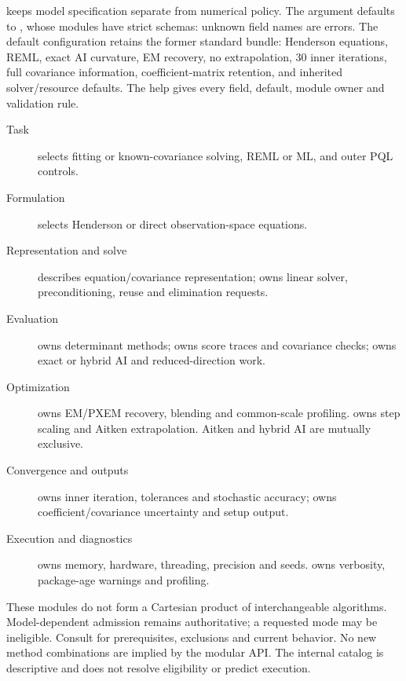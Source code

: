 \documentclass[a4paper]{book}
\begin{document}
%
\begin{Details}\relax


 keeps model specification separate from numerical policy.
The  argument defaults to , whose
modules have strict schemas: unknown field names are errors. The default
configuration retains the former standard bundle: Henderson equations, REML,
exact AI curvature, EM recovery, no extrapolation, 30 inner iterations,
full covariance information, coefficient-matrix retention, and inherited
solver/resource defaults. The  help gives every field,
default, module owner and validation rule.


\begin{description}

\item[Task]  selects fitting or known-covariance solving,
REML or ML, and outer PQL controls.
\item[Formulation]  selects Henderson or direct
observation-space equations.
\item[Representation and solve]  describes
equation/covariance representation;  owns linear solver,
preconditioning, reuse and elimination requests.
\item[Evaluation]  owns determinant methods;
 owns score traces and covariance checks;
 owns exact or hybrid AI and reduced-direction work.
\item[Optimization]  owns EM/PXEM recovery, blending
and common-scale profiling.  owns step scaling and
Aitken extrapolation. Aitken and hybrid AI are mutually exclusive.
\item[Convergence and outputs]  owns inner
iteration, tolerances and stochastic accuracy;  owns
coefficient/covariance uncertainty and setup output.
\item[Execution and diagnostics]  owns memory,
hardware, threading, precision and seeds.  owns
verbosity, package-age warnings and profiling.

\end{description}


These modules do not form a Cartesian product of interchangeable algorithms.
Model-dependent admission remains authoritative; a requested mode may be
ineligible. Consult  for prerequisites, exclusions
and current behavior. No new method combinations are implied by the modular API.
The internal  catalog is descriptive and does
not resolve eligibility or predict execution.

\end{Details}
\end{document}
